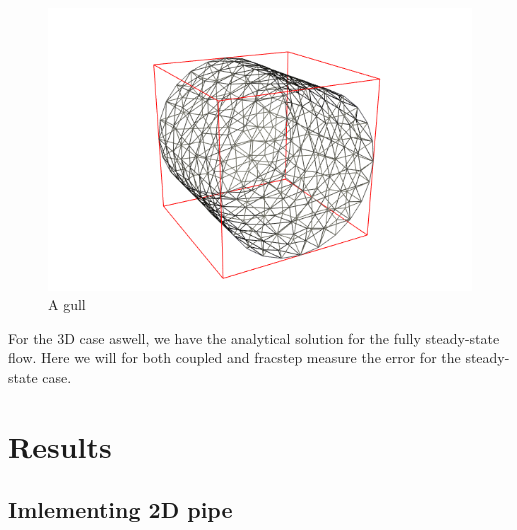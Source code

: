 \documentclass[a4paper,norsk]{article}
\begin{document}
\begin{figure}[h!]
    \includegraphics[scale=0.5]{tube.png}
  \caption{A gull}
\end{figure}
For the 3D case aswell, we have the analytical solution for the fully steady-state flow. Here we will
for both coupled and fracstep measure the error for the steady-state case.

\newpage
\section*{Results}
\subsection*{Imlementing 2D pipe}
\end{document}
